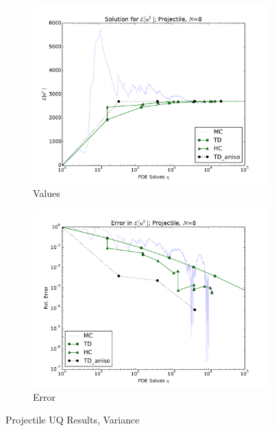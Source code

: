 \documentclass[11pt]{article}
\begin{document}
\begin{figure}[H]
    \centering
    \begin{subfigure}[b]{0.49 \textwidth}
      \includegraphics[width=\textwidth]{../graphics/projectile_solns_aniso_variance}
      \caption{Values}
      \label{atn vals hdmr}
  \end{subfigure}
\begin{subfigure}[b]{0.49 \textwidth}
\centering
      \includegraphics[width=\textwidth]{../graphics/projectile_errs_aniso_variance}
      \caption{Error}
      \label{atn errs hdmr}
    \end{subfigure}
  \caption{Projectile UQ Results, Variance}
  \label{proj anis variance}
  \end{figure}
\end{document}
